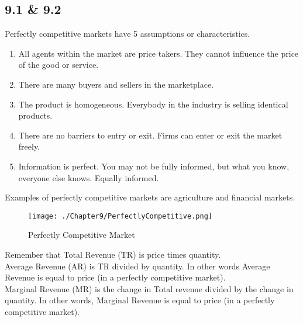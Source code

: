 \subsection*{9.1 \& 9.2}
Perfectly competitive markets have 5 assumptions or characteristics.
\begin{enumerate}
    \item All agents within the market are price takers. They cannot influence the price of the good or service.
    \item There are many buyers and sellers in the marketplace.
    \item The product is homogeneous. Everybody in the industry is selling identical products.
    \item There are no barriers to entry or exit. Firms can enter or exit the market freely.
    \item Information is perfect. You may not be fully informed, but what you know, everyone else knows. Equally informed.
\end{enumerate}
Examples of perfectly competitive markets are agriculture and financial markets.
\begin{figure}[H]
    \centering
    \texttt{[image: ./Chapter9/PerfectlyCompetitive.png]}
    \caption{Perfectly Competitive Market}
\end{figure}
\par
Remember that Total Revenue (TR) is price times quantity.\\
Average Revenue (AR) is TR divided by quantity. In other words Average Revenue is equal to price (in a perfectly competitive market).\\
Marginal Revenue (MR) is the change in Total revenue divided by the change in quantity. In other words, Marginal Revenue is equal to price (in a perfectly competitive market).